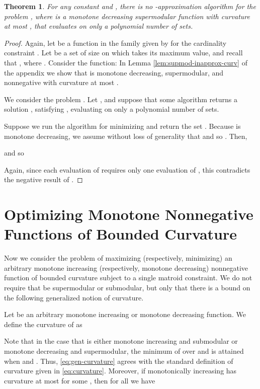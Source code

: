 \documentclass{article}
\newtheorem{theorem}{Theorem}[section]
\theoremstyle{definition}
\begin{document}
\begin{theorem}
\label{lem:supmod-inapprox}
For any constant  and , there is no -approximation algorithm for the problem , where  is a monotone decreasing supermodular function with curvature at most , that evaluates  on only a polynomial number of sets.
\end{theorem}
\begin{proof}
Again, let  be a function in the family given by \cite{Nemhauser1978} for the cardinality constraint .  Let  be a set of size  on which  takes its maximum value, and recall that , where .   Consider the function:   In Lemma \ref{lem:supmod-inapprox-curv} of the appendix we show that  is monotone decreasing, supermodular, and nonnegative with curvature at most .   

We consider the problem .  Let , and suppose that some algorithm returns a solution , satisfying , evaluating  on only a polynomial number of sets.  

Suppose we run the algorithm for minimizing  and return the set .  Because  is monotone decreasing, we assume without loss of generality that  and so .  Then,

and so

Again, since each evaluation of  requires only one evaluation of , this contradicts the negative result of \cite{Nemhauser1978}.
\end{proof}

\section{Optimizing Monotone Nonnegative Functions of Bounded Curvature}
Now we consider the problem of maximizing (respectively, minimizing) an arbitrary monotone increasing (respectively, monotone decreasing) nonnegative  function  of bounded curvature subject to a single matroid constraint.  We do not require that  be supermodular or submodular, but only that there is a bound on the following generalized notion of curvature.

Let  be an arbitrary monotone increasing or monotone decreasing function.  We define the curvature  of  as

Note that in the case that  is either monotone increasing and submodular or monotone decreasing and supermodular, the minimum of  over  and  is attained when  and .  Thus,  \eqref{eq:gen-curvature} agrees with the standard definition of curvature given in \eqref{eq:curvature}.  Moreover, if monotonically increasing  has curvature at most  for some , then for all  we have 
\end{document}
